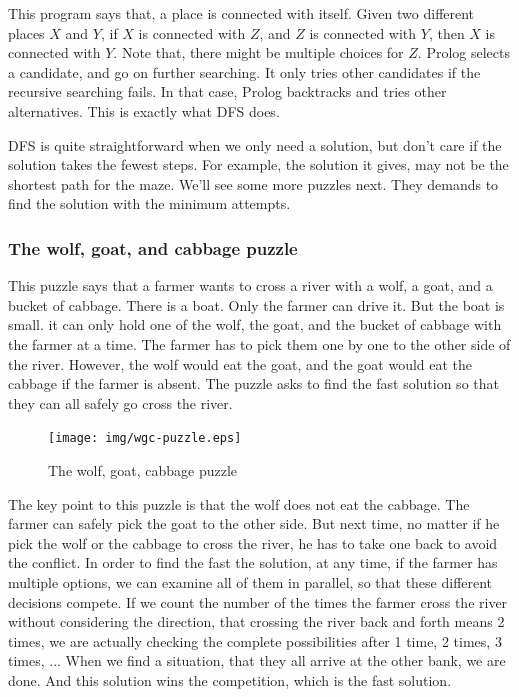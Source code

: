 \documentclass[UTF8]{article}
\begin{document}
This program says that, a place is connected with itself. Given two different places $X$ and
$Y$, if $X$ is connected with $Z$, and $Z$ is connected with $Y$, then $X$ is connected with $Y$.
Note that, there might be multiple choices for $Z$. Prolog selects a candidate, and go on further
searching. It only tries other candidates if the recursive searching fails. In that case, Prolog
backtracks and tries other alternatives. This is exactly what DFS does.

DFS is quite straightforward when we only need a solution, but don't care if the solution takes
the fewest steps. For example, the solution it gives, may not be the shortest path for the maze. We'll
see some more puzzles next. They demands to find the solution with the minimum attempts.


\subsubsection{The wolf, goat, and cabbage puzzle}
This puzzle says that a farmer wants to cross a river with a wolf, a goat, and a bucket of cabbage.
There is a boat. Only the farmer can drive it. But the boat is small. it can only hold one of the
wolf, the goat, and the bucket of cabbage with the farmer at a time. The farmer has to pick
them one by one to the other side of the river. However, the wolf would eat the goat, and the
goat would eat the cabbage if the farmer is absent. The puzzle asks to find the fast solution
so that they can all safely go cross the river.

\begin{figure}[htbp]
 \centering
 \texttt{[image: img/wgc-puzzle.eps]}
 \caption{The wolf, goat, cabbage puzzle}
 \label{fig:wgc-puzzle}
\end{figure}

The key point to this puzzle is that the wolf does not eat the cabbage. The farmer can safely
pick the goat to the other side. But next time, no matter if he pick the wolf or the cabbage
to cross the river, he has to take one back to avoid the conflict. In order to find the
fast the solution, at any time, if the farmer has multiple options, we can examine all of them
in parallel, so that these different decisions compete. If we count the number of the
times the farmer cross the river without considering the direction, that crossing the river
back and forth means 2 times, we are actually checking the complete possibilities after 1 time,
2 times, 3 times, ... When we find a situation, that they all arrive at the other bank,
we are done. And this solution wins the competition, which is the fast solution.
\end{document}
